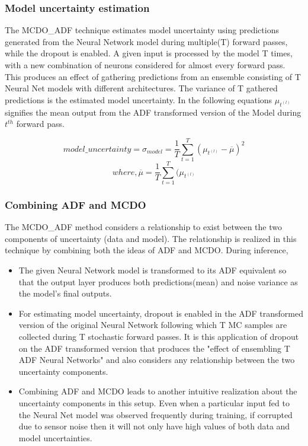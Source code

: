 	\subsubsection{Model uncertainty estimation}
	The MCDO\_ADF technique estimates model uncertainty using predictions generated from the Neural Network model during multiple(T) forward passes, while the dropout is enabled. A given input is processed by the model T times, with a new combination of neurons considered for almost every forward pass. This produces an effect of gathering predictions from an ensemble consisting of T Neural Net models with different architectures. The variance of T gathered predictions is the estimated model uncertainty. In the following equations $\mu_{t^{(l)}}$ signifies the mean output from the ADF transformed version of the Model during $t^{th}$ forward pass.
	
	\begin{equation}
		model\_uncertainty = \sigma_{model} =  \frac{1}{T}\sum_{t=1}^{T}(\mu_{t^{(l)}}-\overline{\mu})^2
	\end{equation}
	\begin{equation} 
		where, \overline{\mu} = \frac{1}{T}\sum_{t=1}^{T}(\mu_{t^{(l)}} 
	\end{equation}
	\subsubsection{Combining ADF and MCDO}
	The MCDO\_ADF method considers a relationship to exist between the two components of uncertainty (data and model). The relationship  is realized in this technique by combining both the ideas of ADF and MCDO. During inference,  
	\begin{itemize}
		\item The given Neural Network model is transformed to its ADF equivalent so that the output layer produces both predictions(mean) and noise variance as the model's final outputs.
		\item For estimating model uncertainty,  dropout is enabled in the ADF transformed version of the original Neural Network following which T MC samples are collected during T stochastic forward passes. It is this application of dropout on the ADF transformed version that produces the "effect of ensembling T ADF Neural Networks" and also considers any relationship between the two uncertainty components.
		\item Combining ADF and MCDO leads to another intuitive realization about the uncertainty components in this setup. Even when a particular input fed to the Neural Net model was observed frequently during training, if corrupted due to sensor noise then it will not only have high values of both data and model uncertainties. 
		
	\end{itemize}
	
